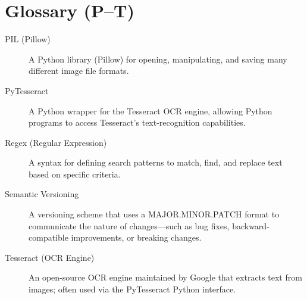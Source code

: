 \section*{Glossary (P–T)}
\begin{description}
  \item[PIL (Pillow)] 
    A Python library (Pillow) for opening, manipulating, and saving many different image file formats.
  \item[PyTesseract] 
    A Python wrapper for the Tesseract OCR engine, allowing Python programs to access 
    Tesseract’s text-recognition capabilities.
  \item[Regex (Regular Expression)] 
    A syntax for defining search patterns to match, find, and replace text based on specific criteria.
  \item[Semantic Versioning] 
    A versioning scheme that uses a MAJOR.MINOR.PATCH format to communicate the nature 
    of changes—such as bug fixes, backward-compatible improvements, or breaking changes.
  \item[Tesseract (OCR Engine)] 
    An open-source OCR engine maintained by Google that extracts text from images;  
    often used via the PyTesseract Python interface.
\end{description}
